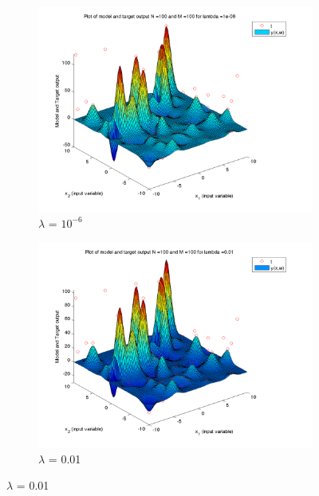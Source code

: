 \documentclass{article}
\begin{document}
\begin{figure}[H]

\begin{subfigure}{.5\textwidth}
\centering
\includegraphics[width=\linewidth]{D2/Varyinglambda_N100M100lambda1e-06}
\caption{$\lambda$ = $10^{-6}$}
\end{subfigure}
\begin{subfigure}{.5\textwidth}
\includegraphics[width=\linewidth]{D2/Varyinglambda_N100M100lambda0_01}
\caption{$\lambda$ = 0.01}
\end{subfigure}



\end{figure}
\end{document}
